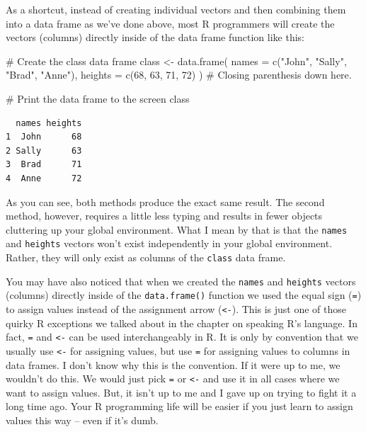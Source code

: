 \documentclass[
  letterpaper,
  DIV=11,
  numbers=noendperiod]{scrreprt}
\newenvironment{Shaded}{\begin{snugshade}}{\end{snugshade}}
\newcommand{\AttributeTok}[1]{\textcolor[rgb]{0.40,0.45,0.13}{#1}}
\newcommand{\CommentTok}[1]{\textcolor[rgb]{0.37,0.37,0.37}{#1}}
\newcommand{\DecValTok}[1]{\textcolor[rgb]{0.68,0.00,0.00}{#1}}
\newcommand{\FunctionTok}[1]{\textcolor[rgb]{0.28,0.35,0.67}{#1}}
\newcommand{\NormalTok}[1]{\textcolor[rgb]{0.00,0.23,0.31}{#1}}
\newcommand{\OtherTok}[1]{\textcolor[rgb]{0.00,0.23,0.31}{#1}}
\newcommand{\StringTok}[1]{\textcolor[rgb]{0.13,0.47,0.30}{#1}}
\begin{document}
As a shortcut, instead of creating individual vectors and then combining
them into a data frame as we've done above, most R programmers will
create the vectors (columns) directly inside of the data frame function
like this:

\begin{Shaded}
\begin{Highlighting}[]
\CommentTok{\# Create the class data frame}
\NormalTok{class }\OtherTok{\textless{}{-}} \FunctionTok{data.frame}\NormalTok{(}
  \AttributeTok{names   =} \FunctionTok{c}\NormalTok{(}\StringTok{"John"}\NormalTok{, }\StringTok{"Sally"}\NormalTok{, }\StringTok{"Brad"}\NormalTok{, }\StringTok{"Anne"}\NormalTok{),}
  \AttributeTok{heights =} \FunctionTok{c}\NormalTok{(}\DecValTok{68}\NormalTok{, }\DecValTok{63}\NormalTok{, }\DecValTok{71}\NormalTok{, }\DecValTok{72}\NormalTok{)}
\NormalTok{) }\CommentTok{\# Closing parenthesis down here.}

\CommentTok{\# Print the data frame to the screen}
\NormalTok{class}
\end{Highlighting}
\end{Shaded}

\begin{verbatim}
  names heights
1  John      68
2 Sally      63
3  Brad      71
4  Anne      72
\end{verbatim}

As you can see, both methods produce the exact same result. The second
method, however, requires a little less typing and results in fewer
objects cluttering up your global environment. What I mean by that is
that the \texttt{names} and \texttt{heights} vectors won't exist
independently in your global environment. Rather, they will only exist
as columns of the \texttt{class} data frame.

You may have also noticed that when we created the \texttt{names} and
\texttt{heights} vectors (columns) directly inside of the
\texttt{data.frame()} function we used the equal sign (\texttt{=}) to
assign values instead of the assignment arrow (\texttt{\textless{}-}).
This is just one of those quirky R exceptions we talked about in the
chapter on speaking R's language. In fact, \texttt{=} and
\texttt{\textless{}-} can be used interchangeably in R. It is only by
convention that we usually use \texttt{\textless{}-} for assigning
values, but use \texttt{=} for assigning values to columns in data
frames. I don't know why this is the convention. If it were up to me, we
wouldn't do this. We would just pick \texttt{=} or \texttt{\textless{}-}
and use it in all cases where we want to assign values. But, it isn't up
to me and I gave up on trying to fight it a long time ago. Your R
programming life will be easier if you just learn to assign values this
way -- even if it's dumb. 🤷
\end{document}
